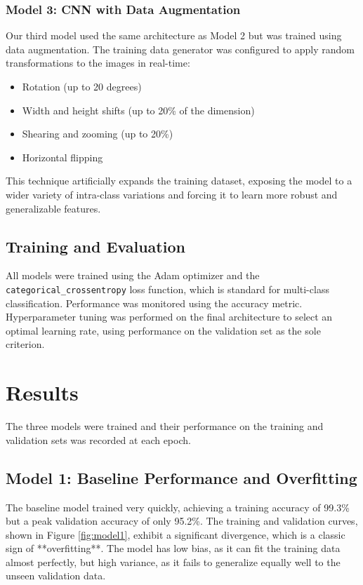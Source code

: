 \documentclass[pdflatex,sn-mathphys-num]{sn-jnl}%
\theoremstyle{thmstyleone}%
\theoremstyle{thmstyletwo}%
\theoremstyle{thmstylethree}%
\begin{document}
\subsubsection{Model 3: CNN with Data Augmentation}
Our third model used the same architecture as Model 2 but was trained using data augmentation. The training data generator was configured to apply random transformations to the images in real-time:
\begin{itemize}
    \item Rotation (up to 20 degrees)
    \item Width and height shifts (up to 20\% of the dimension)
    \item Shearing and zooming (up to 20\%)
    \item Horizontal flipping
\end{itemize}
This technique artificially expands the training dataset, exposing the model to a wider variety of intra-class variations and forcing it to learn more robust and generalizable features.

\subsection{Training and Evaluation}
All models were trained using the Adam optimizer and the \texttt{categorical\_crossentropy} loss function, which is standard for multi-class classification. Performance was monitored using the accuracy metric. Hyperparameter tuning was performed on the final architecture to select an optimal learning rate, using performance on the validation set as the sole criterion.

\section{Results}\label{sec2}

The three models were trained and their performance on the training and validation sets was recorded at each epoch.

\subsection{Model 1: Baseline Performance and Overfitting}
The baseline model trained very quickly, achieving a training accuracy of 99.3\% but a peak validation accuracy of only 95.2\%. The training and validation curves, shown in Figure \ref{fig:model1}, exhibit a significant divergence, which is a classic sign of **overfitting**. The model has low bias, as it can fit the training data almost perfectly, but high variance, as it fails to generalize equally well to the unseen validation data.
\end{document}
